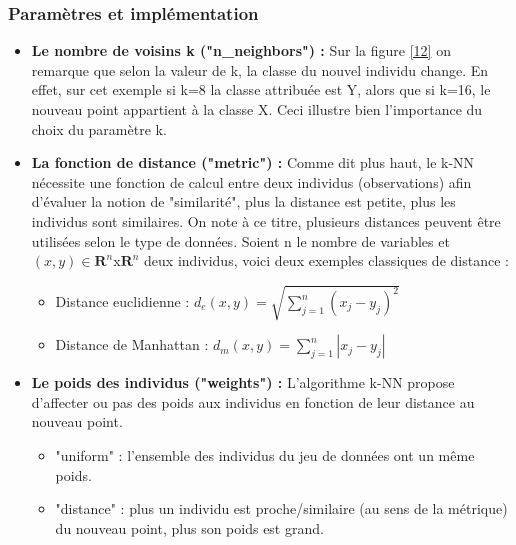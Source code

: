\documentclass[11pt]{article}
\begin{document}
\subsubsection{Paramètres et implémentation}

\begin{itemize}
    \item \textbf{Le nombre de voisins k ("n\_neighbors") :}
    Sur la figure \ref{12} on remarque que selon la valeur de k, la classe du nouvel individu change. En effet, sur cet exemple si k=8 la classe attribuée est Y, alors que si k=16, le nouveau point appartient à la classe X. Ceci illustre bien l'importance du choix du paramètre k.\par
    
    \item \textbf{La fonction de distance ("metric") :}
    Comme dit plus haut, le k-NN nécessite une fonction de calcul entre deux individus (observations) afin d'évaluer la notion de "similarité", plus la distance est petite, plus les individus sont similaires.
    On note à ce titre, plusieurs distances peuvent être utilisées selon le type de données. Soient n le nombre de variables et $(x,y) \in \mathbf{R}^{n}$x$\mathbf{R}^{n}$ deux individus, voici deux exemples classiques de distance :
        \begin{itemize}
        \renewcommand{\labelitemii}{-}
            \item Distance euclidienne : $d_{e}(x,y)=\sqrt{\sum_{j=1}^{n}\left(x_{j}-y_{j}\right)^{2}}$
        
            \item Distance de Manhattan : $d_{m}(x,y)=\sum_{j=1}^{n}\left|x_{j}-y_{j}\right|$
        \end{itemize}
        
    \item \textbf{Le poids des individus ("weights") :}
    L'algorithme k-NN propose d'affecter ou pas des poids aux individus en fonction de leur distance au nouveau point.
        \begin{itemize}
        \renewcommand{\labelitemii}{-}
            \item "uniform" : l'ensemble des individus du jeu de données ont un même poids.
            
            \item "distance" : plus un individu est proche/similaire (au sens de la métrique) du nouveau point, plus son poids est grand.
        \end{itemize}
\end{itemize}
\end{document}
